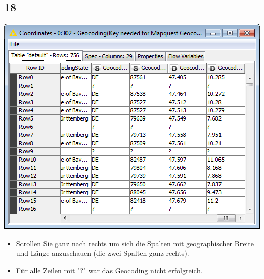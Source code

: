 \documentclass{beamer}
\begin{document}
\subsection{18}
\begin{frame}
	\begin{center}
  		\includegraphics[height=0.6\textheight]{18.png}
	\end{center}
	\begin{itemize}
		\item Scrollen Sie ganz nach rechts um sich die Spalten mit geographischer Breite und Länge anzuschauen (die zwei Spalten ganz rechts).
		\item Für alle Zeilen mit "?" war das Geocoding nicht erfolgreich.
	\end{itemize}
\end{frame}
\end{document}
